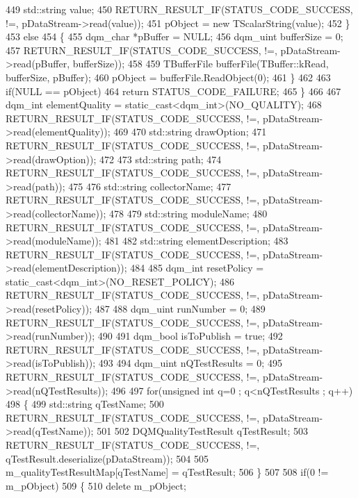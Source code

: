 \begin{DoxyCode}
449       std::string value;
450       RETURN_RESULT_IF(STATUS\_CODE\_SUCCESS, !=, pDataStream->read(value));
451       pObject = \textcolor{keyword}{new} TScalarString(value);
452     \}
453     \textcolor{keywordflow}{else}
454     \{
455       dqm_char *pBuffer = NULL;
456       dqm_uint bufferSize = 0;
457       RETURN_RESULT_IF(STATUS\_CODE\_SUCCESS, !=, pDataStream->read(pBuffer, bufferSize));
458 
459       TBufferFile bufferFile(TBuffer::kRead, bufferSize, pBuffer);
460       pObject = bufferFile.ReadObject(0);
461     \}
462 
463     \textcolor{keywordflow}{if}(NULL == pObject)
464       \textcolor{keywordflow}{return} STATUS\_CODE\_FAILURE;
465   \}
466 
467   dqm_int elementQuality = \textcolor{keyword}{static\_cast<}dqm_int\textcolor{keyword}{>}(NO\_QUALITY);
468   RETURN_RESULT_IF(STATUS\_CODE\_SUCCESS, !=, pDataStream->read(elementQuality));
469 
470   std::string drawOption;
471   RETURN_RESULT_IF(STATUS\_CODE\_SUCCESS, !=, pDataStream->read(drawOption));
472 
473   std::string path;
474   RETURN_RESULT_IF(STATUS\_CODE\_SUCCESS, !=, pDataStream->read(path));
475 
476   std::string collectorName;
477   RETURN_RESULT_IF(STATUS\_CODE\_SUCCESS, !=, pDataStream->read(collectorName));
478 
479   std::string moduleName;
480   RETURN_RESULT_IF(STATUS\_CODE\_SUCCESS, !=, pDataStream->read(moduleName));
481 
482   std::string elementDescription;
483   RETURN_RESULT_IF(STATUS\_CODE\_SUCCESS, !=, pDataStream->read(elementDescription));
484 
485   dqm_int resetPolicy = \textcolor{keyword}{static\_cast<}dqm_int\textcolor{keyword}{>}(NO\_RESET\_POLICY);
486   RETURN_RESULT_IF(STATUS\_CODE\_SUCCESS, !=, pDataStream->read(resetPolicy));
487 
488   dqm_uint runNumber = 0;
489   RETURN_RESULT_IF(STATUS\_CODE\_SUCCESS, !=, pDataStream->read(runNumber));
490 
491   dqm_bool isToPublish = \textcolor{keyword}{true};
492   RETURN_RESULT_IF(STATUS\_CODE\_SUCCESS, !=, pDataStream->read(isToPublish));
493 
494   dqm_uint nQTestResults = 0;
495   RETURN_RESULT_IF(STATUS\_CODE\_SUCCESS, !=, pDataStream->read(nQTestResults));
496 
497   \textcolor{keywordflow}{for}(\textcolor{keywordtype}{unsigned} \textcolor{keywordtype}{int} q=0 ; q<nQTestResults ; q++)
498   \{
499     std::string qTestName;
500     RETURN_RESULT_IF(STATUS\_CODE\_SUCCESS, !=, pDataStream->read(qTestName));
501 
502     DQMQualityTestResult qTestResult;
503     RETURN_RESULT_IF(STATUS\_CODE\_SUCCESS, !=, qTestResult.deserialize(pDataStream));
504 
505     m\_qualityTestResultMap[qTestName] = qTestResult;
506   \}
507 
508   \textcolor{keywordflow}{if}(0 != m\_pObject)
509   \{
510     \textcolor{keyword}{delete} m\_pObject;

\end{DoxyCode}
